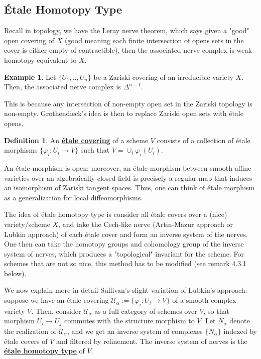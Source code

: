 \documentclass{article}
\theoremstyle{definition}
\theoremstyle{definition}
\newtheorem{definition}{Definition}[theorem]
\theoremstyle{definition}
\theoremstyle{definition}
\theoremstyle{definition}
\theoremstyle{definition}
\theoremstyle{definition}
\newtheorem{example}{Example}[theorem]
\begin{document}
\subsection{\'Etale Homotopy Type}
Recall in topology, we have the Leray nerve theorem, which says given a "good" open covering of $X$ (good meaning each finite intersection of opens sets in the cover is either empty of contractible), then the associated nerve complex is weak homotopy equivalent to $X$.


\begin{tcolorbox}[colback=yellow!5!white,colframe=yellow!30!white]
\begin{example}
Let $\{U_1,..,U_n\}$ be a Zariski covering of an irreducible variety $X$. Then, the associated nerve complex is $\Delta^{n-1}$.
\end{example}
\end{tcolorbox}
This is because any intersection of non-empty open set in the Zariski topology is non-empty. Grothendieck's idea is then to replace Zariski open sets with \'etale opens.

\begin{tcolorbox}[colback=purple!5!white,colframe=purple!75!black]
\begin{definition}
An \underline{\textbf{\'etale covering}} of a scheme $V$ consists of a collection of \'etale morphisms $\{\varphi_i: U_i\to V\}$ such that $V=\cup_i\varphi_i(U_i)$.
\end{definition}
\end{tcolorbox}
An \'etale morphism is open; moreover, an \'etale morphism between smooth affine varieties over an algebraically closed field is precisely a regular map that induces an isomorphism of Zariski tangent spaces. Thus, one can think of \'etale morphism as a generalization for local diffeomorphisms.

The idea of \'etale homotopy type is consider all \'etale covers over a (nice) variety/scheme $X$, and take the Cech-like nerve (Artin-Mazur approach or Lubkin approach) of each \'etale cover and form an inverse system of the nerves. One then can take the homotopy groups and cohomology group of the inverse system of nerves, which produces a "topological" invariant for the scheme. For schemes that are not so nice, this method has to be modified (see remark 4.3.1 below).


We now explain more in detail Sullivan's slight variation of Lubkin's approach: suppose we have an \'etale covering $\mathcal{U}_{\alpha}:=\{\varphi_i: U_i\to V\}$ of a smooth complex variety $V$. Then, consider $\mathcal{U}_{\alpha}$ as a full category of schemes over $V$, so that morphism $U_i\to U_j$ commutes with the structure morphism to $V$. Let $N_{\alpha}$ denote the realization of $\mathcal{U}_{\alpha}$, and we get an inverse system of complexes $\{N_{\alpha}\}$ indexed by \'etale covers of $V$ and filtered by refinement. The inverse system of nerves is the \underline{\textbf{\'etale homotopy type}} of $V$.
\end{document}
